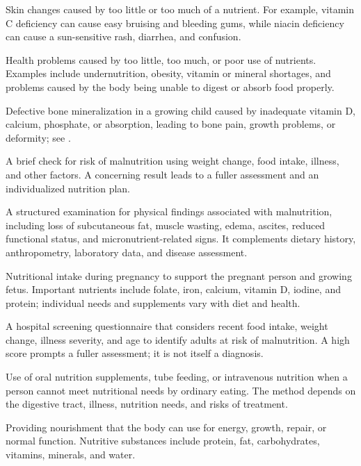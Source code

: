  Skin changes caused by too little or too much of a nutrient. For example, vitamin C deficiency can cause easy bruising and bleeding gums, while niacin deficiency can cause a sun-sensitive rash, diarrhea, and confusion.

 Health problems caused by too little, too much, or poor use of nutrients. Examples include undernutrition, obesity, vitamin or mineral shortages, and problems caused by the body being unable to digest or absorb food properly.

 Defective bone mineralization in a growing child caused by inadequate vitamin D, calcium, phosphate, or absorption, leading to bone pain, growth problems, or deformity; see .

 A brief check for risk of malnutrition using weight change, food intake, illness, and other factors. A concerning result leads to a fuller assessment and an individualized nutrition plan.

 A structured examination for physical findings associated with malnutrition, including
loss of subcutaneous fat, muscle wasting, edema, ascites, reduced functional status, and
micronutrient-related signs. It complements dietary history, anthropometry, laboratory
data, and disease assessment.

 Nutritional intake during pregnancy to support the pregnant person and growing fetus. Important nutrients include folate, iron, calcium, vitamin D, iodine, and protein; individual needs and supplements vary with diet and health.

 A hospital screening questionnaire that considers recent food intake, weight change, illness severity, and age to identify adults at risk of malnutrition. A high score prompts a fuller assessment; it is not itself a diagnosis.

 Use of oral nutrition supplements, tube feeding, or intravenous nutrition when a person cannot meet nutritional needs by ordinary eating. The method depends on the digestive tract, illness, nutrition needs, and risks of treatment.

 Providing nourishment that the body can use for energy, growth, repair, or normal function. Nutritive substances include protein, fat, carbohydrates, vitamins, minerals, and water.

